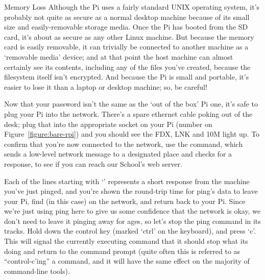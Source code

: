 \begin{danger}{Memory Loss} 
Although the Pi uses a fairly standard UNIX operating system, it's probably not quite as secure as a normal desktop machine because of its small size and easily-removable storage media. Once the Pi has booted from the SD card, it's about as secure as any other Linux machine. But because the memory card is easily removable, it can trivially be connected to another machine as a `removable media' device; and at that point the host machine can almost certainly see its contents, including any of the files you've created, because the filesystem itself isn't encrypted. And because the Pi is small and portable, it's easier to lose it than a laptop or desktop machine; so, be careful!
\end{danger}

Now that your password isn't the same as the `out of the box' Pi one, it's safe to plug your Pi into the network. There's a spare ethernet cable poking out of the desk; plug that into the appropriate socket on your Pi (number  on Figure~\ref{figure:bare-rpi}) and you should see the FDX, LNK and 10M light up. To confirm that you're now connected to the network, use the  command, which sends a low-level network message to a designated place and checks for a response, to see if you can reach our School's web server. 


Each of the lines starting with `' represents a short response from the machine you've just pinged, and you're shown the round-trip time for ping's data to leave your Pi, find (in this case)  on the network, and return back to your Pi. Since we're just using ping here to give us some confidence that the network is okay, we don't need to leave it pinging away for ages, so let's stop the ping command in its tracks. Hold down the control key (marked `ctrl' on the keyboard), and press `c'. This will signal the currently executing command that it should stop what its doing and return to the command prompt (quite often this is referred to as ``control-c'ing'' a command, and it will have the same effect on the majority of command-line tools).

